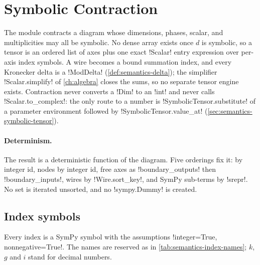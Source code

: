 \section{Symbolic Contraction}\label{sec:semantics-symbolic}

The module  contracts a diagram whose dimensions, phases, scalar, and \bbox{} multiplicities may all be symbolic. No dense array exists once $d$ is symbolic, so a tensor is an ordered list of axes plus one exact \py!Scalar! entry expression over per-axis index symbols. A wire becomes a bound summation index, and every Kronecker delta is a \py!ModDelta! (\cref{def:semantics-delta}); the simplifier \py!Scalar.simplify! of \cref{ch:algebra} closes the sums, so no separate tensor engine exists. Contraction never converts a \py!Dim! to an \py!int! and never calls \py!Scalar.to_complex!: the only route to a number is \py!SymbolicTensor.substitute! of a parameter environment followed by \py!SymbolicTensor.value_at! (\cref{sec:semantics-symbolic-tensor}).

\paragraph{Determinism.} The result is a deterministic function of the diagram. Five orderings fix it: \bboxes{} by integer id, nodes by integer id, free axes as \py!boundary_outputs! then \py!boundary_inputs!, wires by \py!Wire.sort_key!, and SymPy sub-terms by \py!srepr!. No set is iterated unsorted, and no \py!sympy.Dummy! is created.

\subsection{Index symbols}\label{sec:semantics-symbolic-names}

Every index is a SymPy symbol with the assumptions \code!integer=True, nonnegative=True!. The names are reserved as in \cref{tab:semantics-index-names}; $k$, $g$ and $i$ stand for decimal numbers.

